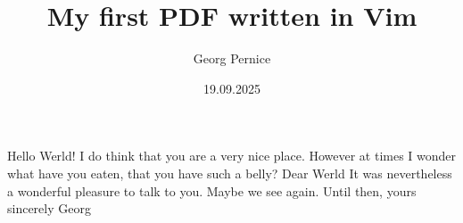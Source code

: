\documentclass{article}
\title{My first PDF written in Vim}
\date{19.09.2025}
\author{Georg Pernice}
\begin{document}
	\maketitle
	\newpage
	Hello Werld! I do think that you are a very nice place. However at times I wonder what have you eaten, that you have such a belly? Dear Werld It was nevertheless a wonderful pleasure to talk to you. Maybe we see again. Until then, yours sincerely Georg
\end{document}
